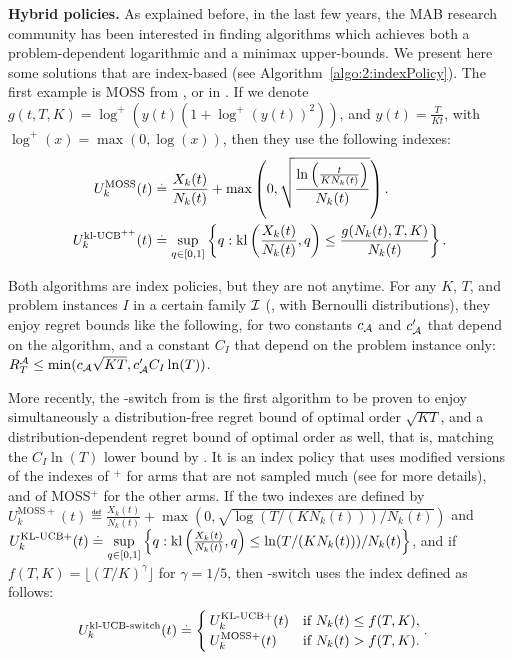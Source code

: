 \textbf{Hybrid policies.}
%
As explained before, in the last few years, the MAB research community has been interested in finding algorithms which achieves both a problem-dependent logarithmic and a minimax upper-bounds.
We present here some solutions that are index-based (see Algorithm~\ref{algo:2:indexPolicy}).
The first example is MOSS from \cite{Audibert2009minimax}, or \KLUCBpp{} in \cite{Menard17}.
If we denote $g(t, T, K) = \log^+(y(t) (1 + \log^+(y(t))^2))$, and $y(t) = \frac{T}{K t}$, with $\log^+(x) = \max(0, \log(x))$,
then they use the following indexes:
\begin{align*}\label{eq:2:indexes_for_MOSS_klUCBpp}
    U^{\mathrm{MOSS}}_k(t) & \overset{.}{=} \frac{X_k(t)}{N_k(t)} + \max\left(0, \sqrt{ \frac{\ln\left(\frac{t}{K N_k(t)}\right)}{N_k(t)} } \right). \\
    U^{\mathrm{kl}\text{-}\mathrm{UCB}^{++}}_k(t) & \overset{.}{=} \sup\limits_{q \in [0,1]} \left\{ q : \mathrm{kl}\left(\frac{X_k(t)}{N_k(t)}, q\right) \leq \frac{g(N_k(t), T, K)}{N_k(t)} \right\}.
\end{align*}

Both algorithms are index policies, but they are not anytime.
For any $K$, $T$, and problem instances $I$ in a certain family $\mathcal{I}$ (\eg, with Bernoulli distributions),
they enjoy regret bounds like the following, for two constants $c_{\mathcal{A}}$ and $c'_{\mathcal{A}}$ that depend on the algorithm, and a constant $C_I$ that depend on the problem instance only: $R_T^{\mathcal{A}} \leq \min( c_{\mathcal{A}} \sqrt{K T}, c'_{\mathcal{A}} C_I \ln(T))$.

More recently, the \klUCB-switch from \cite{Garivier18} is the first algorithm to be proven to
enjoy simultaneously a distribution-free regret bound of optimal order $\sqrt{KT}$, and a distribution-dependent regret bound of optimal order as well, that is, matching the $C_I \ln(T)$ lower bound by \cite{LaiRobbins85}.
It is an index policy that uses modified versions of the indexes of \klUCB$^+$ for arms that are not sampled much (see \cite{Honda2019} for more details), and of MOSS$^+$ for the other arms.
If the two indexes
are defined by
$U^{\mathrm{MOSS}+}_k(t) \eqdef \frac{X_k(t)}{N_k(t)} + \max\left(0, \sqrt{ \log\left(T / (K N_k(t))\right) / N_k(t)} \right)$
and
$U^{\mathrm{KL}\text{-}\mathrm{UCB}+}_k(t) \overset{.}{=} \sup\limits_{q \in [0,1]} \left\{ q : \mathrm{kl}\left(\frac{X_k(t)}{N_k(t)}, q\right) \leq \ln(T / (K N_k(t))) / N_k(t) \right\}$,
and if $f(T, K) = \lfloor (T/K)^{\gamma}\rfloor$ for $\gamma=1/5$,
then \klUCB-switch uses the index defined as follows:
\begin{align*}
    U^{\mathrm{kl}\text{-}\mathrm{UCB}\text{-}\mathrm{switch}}_k(t) & \overset{.}{=} \begin{cases}
        U^{\mathrm{KL}\text{-}\mathrm{UCB}+}_k(t) & \text{if } N_k(t) \leq f(T, K), \\
        U^{\mathrm{MOSS}+}_k(t) & \text{if } N_k(t) > f(T, K).
    \end{cases}.
\end{align*}
%

